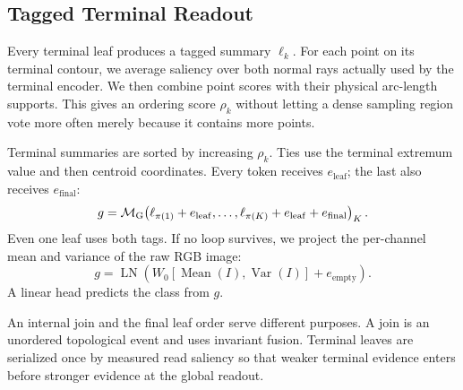 \subsection{Tagged Terminal Readout}

Every terminal leaf produces a tagged summary $\ell_k$. For each point on its terminal contour, we average saliency over both normal rays actually used by the terminal encoder. We then combine point scores with their physical arc-length supports. This gives an ordering score $\rho_k$ without letting a dense sampling region vote more often merely because it contains more points.

Terminal summaries are sorted by increasing $\rho_k$. Ties use the terminal extremum value and then centroid coordinates. Every token receives $e_{\mathrm{leaf}}$; the last also receives $e_{\mathrm{final}}$:
\begin{equation}
g=\mathcal{M}_{\mathrm{G}}\!\left(\ell_{\pi(1)}+e_{\mathrm{leaf}},\ldots,
\ell_{\pi(K)}+e_{\mathrm{leaf}}+e_{\mathrm{final}}\right)_K.
\label{eq:final}
\end{equation}
Even one leaf uses both tags. If no loop survives, we project the per-channel mean and variance of the raw RGB image:
\begin{equation}
g=\operatorname{LN}\!\left(W_0[\operatorname{Mean}(I),\operatorname{Var}(I)]+e_{\mathrm{empty}}\right).
\end{equation}
A linear head predicts the class from $g$.

An internal join and the final leaf order serve different purposes. A join is an unordered topological event and uses invariant fusion. Terminal leaves are serialized once by measured read saliency so that weaker terminal evidence enters before stronger evidence at the global readout.
